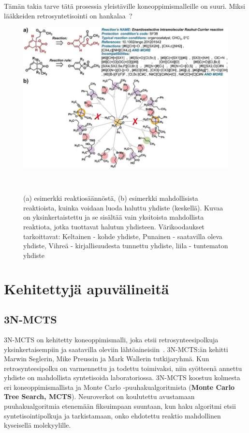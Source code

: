 \documentclass[finnish,twoside,censored,tkt,sw-line]{HYthesisML}
\begin{document}
Tämän takia tarve tätä prosessia yleistäville koneoppimismalleille on suuri.
Miksi lääkkeiden retrosyntetisointi on hankalaa~\cite{ButlerKeithT2018Mlfm,deAlmeidaA.Filipa2019Socd}?
\begin{figure}
    \centering
    \includegraphics[width=\textwidth]{retrosynthesis.jpg}
    \caption{(a) esimerkki reaktiosäännöstä, (b) esimerkki mahdollisista reaktioista, kuinka voidaan luoda haluttu yhdiste (keskellä).
        Kuvaa on yksinkertaistettu ja se sisältää vain yksitoista mahdollista reaktiota, jotka tuottavat halutun yhdisteen.
        Värikoodaukset tarkoittavat: Keltainen - kohde yhdiste, Punainen - saatavilla oleva yhdiste, Vihreä - kirjallisuudesta tunnettu yhdiste, liila - tuntematon yhdiste}
    ~\cite{ExpertKnowledgeRetorsynthesis}
\end{figure}

\section{Kehitettyjä apuvälineitä}

\subsection{3N-MCTS}

3N-MCTS on kehitetty koneoppimismalli, joka etsii retrosynteesipolkuja yksinkertaisempiin ja saatavilla oleviin lähtöaineisiin~\cite{SeglerMarwinHS2018Pcsw}.
3N-MCTS:än kehitti Marwin Seglerin, Mike Preussin ja Mark Wallerin tutkijaryhmä.
Kun retrosynteesipolku on varmennettu ja todettu toimivaksi, niin syötteenä annettu yhdiste on mahdollista syntetisoida laboratoriossa.
3N-MCTS koostuu kolmesta eri koneoppimismallista ja Monte Carlo -puuhakualgoritmista (\textbf{Monte Carlo Tree Search, MCTS}).
Neuroverkot on koulutettu avustamaan puuhakualgoritmia etenemään fiksuimpaan suuntaan, kun haku algoritmi etsii syntetisointipolkuja ja tarkistamaan, onko ehdotettu reaktio mahdollinen kyseisellä molekyylille.
\end{document}
